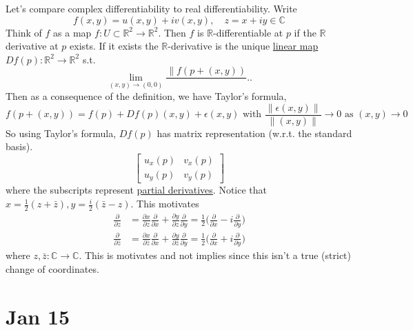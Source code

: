   Let's compare complex differentiability to real differentiability. Write 
  \begin{equation}
    f(x, y) = u(x, y) + i v(x, y), \quad z = x + i y \in \mathbb{C}
  \end{equation} 
  Think of $f$ as a map $f: U \subset \mathbb{R}^2 \to \mathbb{R}^2$. Then $f$ is $\mathbb{R}$-differentiable at $p$ if the $\mathbb{R}$ derivative at $p$ exists. If it exists the $\mathbb{R}$-derivative is the unique \hyperref[lin-def:linear_map]{linear map} $Df(p): \mathbb{R}^2 \to \mathbb{R}^2$ s.t. 
  \begin{equation}
    \lim_{(x, y) \to (0, 0)} \frac{\| f(p + (x, y))}{} ..
  \end{equation} 
  Then as a consequence of the definition, we have Taylor's formula, 
  \begin{equation}
    f(p + (x, y)) = f(p) + Df(p)(x, y) + \epsilon (x, y) \text{ with } \frac{\|\epsilon(x, y)\|}{\|(x, y)\|} \to 0 \text{ as } (x, y) \to 0
  \end{equation}
  So using Taylor's formula, $Df(p)$ has matrix representation (w.r.t. the standard basis). 
  \begin{equation}
    \begin{bmatrix} u_x (p) & v_x (p) \\ u_y (p) & v_y (p) \end{bmatrix}
  \end{equation}
  where the subscripts represent \hyperref[mv-def:partial-derivative]{partial derivatives}. Notice that $x = \frac{1}{2} (z + \bar{z}), y = \frac{i}{2} (\bar{z} - z)$. This motivates 
  \begin{align}
    \frac{\partial}{\partial z} & = \frac{\partial x}{\partial z} \frac{\partial}{\partial x} + \frac{\partial y}{\partial z} \frac{\partial}{\partial y} = \frac{1}{2} \bigg( \frac{\partial}{\partial x} - i \frac{\partial}{\partial y} \bigg) \\ 
    \frac{\partial}{\partial \bar{z}} & = \frac{\partial x}{\partial \bar{z}} \frac{\partial}{\partial x} + \frac{\partial y}{\partial \bar{z}} \frac{\partial}{\partial y} = \frac{1}{2} \bigg( \frac{\partial}{\partial x} + i \frac{\partial}{\partial y} \bigg)
  \end{align}
  where $z, \bar{z}: \mathbb{C} \to \mathbb{C}$. This is motivates and not implies since this isn't a true (strict) change of coordinates. 

\section{Jan 15}

